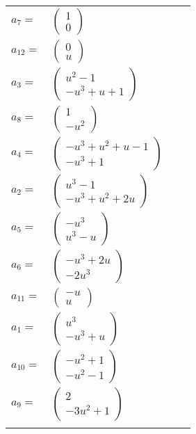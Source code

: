 \documentclass[1p]{elsarticle_modified}
\theoremstyle{definition}
\begin{document}
\begin{tabular}{m{7pt} m{180pt} m{7pt} m{180pt} }
\flushright $a_{7}=$&$\begin{pmatrix}1\\0\end{pmatrix}$ \\
\flushright $a_{12}=$&$\begin{pmatrix}0\\u\end{pmatrix}$ \\
\flushright $a_{3}=$&$\begin{pmatrix}u^2-1\\- u^3+u+1\end{pmatrix}$ \\
\flushright $a_{8}=$&$\begin{pmatrix}1\\- u^2\end{pmatrix}$ \\
\flushright $a_{4}=$&$\begin{pmatrix}- u^3+u^2+u-1\\- u^3+1\end{pmatrix}$ \\
\flushright $a_{2}=$&$\begin{pmatrix}u^3-1\\- u^3+u^2+2 u\end{pmatrix}$ \\
\flushright $a_{5}=$&$\begin{pmatrix}- u^3\\u^3- u\end{pmatrix}$ \\
\flushright $a_{6}=$&$\begin{pmatrix}- u^3+2 u\\-2 u^3\end{pmatrix}$ \\
\flushright $a_{11}=$&$\begin{pmatrix}- u\\u\end{pmatrix}$ \\
\flushright $a_{1}=$&$\begin{pmatrix}u^3\\- u^3+u\end{pmatrix}$ \\
\flushright $a_{10}=$&$\begin{pmatrix}- u^2+1\\- u^2-1\end{pmatrix}$ \\
\flushright $a_{9}=$&$\begin{pmatrix}2\\-3 u^2+1\end{pmatrix}$\\&\end{tabular}
\end{document}
